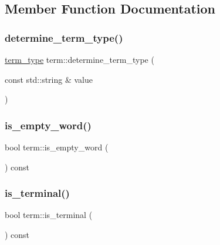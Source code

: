\subsection{Member Function Documentation}
\mbox{\label{classterm_af5a6a6fe4fb502dbdd3ab86b7236e214}} 
\subsubsection{\texorpdfstring{determine\_term\_type()}{determine\_term\_type()}}
{\footnotesize\ttfamily \mbox{\hyperlink{term_8h_a01c5d13b4b82a95ffc3de77e52c7603b}{term\+\_\+type}} term\+::determine\+\_\+term\+\_\+type (\begin{DoxyParamCaption}\item[{const std\+::string \&}]{value }\end{DoxyParamCaption})\hspace{0.3cm}{\ttfamily [static]}}

\mbox{\label{classterm_a2eb38e13f1e6b8b3f8a23c94a5413875}} 
\subsubsection{\texorpdfstring{is\_empty\_word()}{is\_empty\_word()}}
{\footnotesize\ttfamily bool term\+::is\+\_\+empty\+\_\+word (\begin{DoxyParamCaption}{ }\end{DoxyParamCaption}) const}

\mbox{\label{classterm_a141ac4604eaf71b6affdabfa15f0ec03}} 
\subsubsection{\texorpdfstring{is\_terminal()}{is\_terminal()}}
{\footnotesize\ttfamily bool term\+::is\+\_\+terminal (\begin{DoxyParamCaption}{ }\end{DoxyParamCaption}) const}

\mbox{\label{classterm_a1d2889134295448ef5ec37f3b72e6b8e}} 
